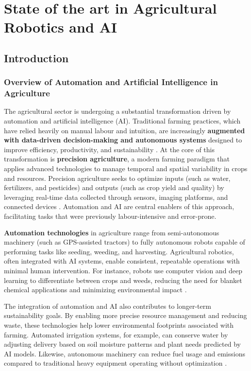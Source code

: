 \chapter{State of the art in Agricultural Robotics and AI}
\section{Introduction}
\subsection{Overview of Automation and Artificial Intelligence in Agriculture}
The agricultural sector is undergoing a substantial transformation driven by automation and artificial intelligence (AI). Traditional farming practices, which have relied heavily on manual labour and intuition, are increasingly \textbf{augmented with data-driven decision-making and autonomous systems} designed to improve efficiency, productivity, and sustainability \citep{Reina2024, AIReview2025}.
At the core of this transformation is \textbf{precision agriculture}, a modern farming paradigm that applies advanced technologies to manage temporal and spatial variability in crops and resources. Precision agriculture seeks to optimize inputs (such as water, fertilizers, and pesticides) and outputs (such as crop yield and quality) by leveraging real-time data collected through sensors, imaging platforms, and connected devices \citep{Springer2025, Reina2024}. Automation and AI are central enablers of this approach, facilitating tasks that were previously labour-intensive and error-prone.

\textbf{Automation technologies} in agriculture range from semi-autonomous machinery (such as GPS-assisted tractors) to fully autonomous robots capable of performing tasks like seeding, weeding, and harvesting. Agricultural robotics, often integrated with AI systems, enable consistent, repeatable operations with minimal human intervention. For instance, robots use computer vision and deep learning to differentiate between crops and weeds, reducing the need for blanket chemical applications and minimizing environmental impact \citep{Comparetti2025, Reina2024}.

The integration of automation and AI also contributes to longer-term sustainability goals. By enabling more precise resource management and reducing waste, these technologies help lower environmental footprints associated with farming. Automated irrigation systems, for example, can conserve water by adjusting delivery based on soil moisture patterns and plant needs predicted by AI models. Likewise, autonomous machinery can reduce fuel usage and emissions compared to traditional heavy equipment operating without optimization \citep{Springer2025, AIReview2025}.

